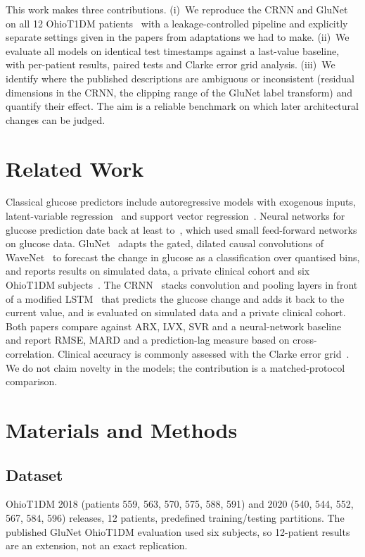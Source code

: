\documentclass[conference]{IEEEtran}
\begin{document}
This work makes three contributions. (i)~We reproduce the CRNN and GluNet on all 12 OhioT1DM patients~\cite{ohio} with a leakage-controlled pipeline and explicitly separate settings given in the papers from adaptations we had to make. (ii)~We evaluate all models on identical test timestamps against a last-value baseline, with per-patient results, paired tests and Clarke error grid analysis. (iii)~We identify where the published descriptions are ambiguous or inconsistent (residual dimensions in the CRNN, the clipping range of the GluNet label transform) and quantify their effect. The aim is a reliable benchmark on which later architectural changes can be judged.
\section{Related Work}
Classical glucose predictors include autoregressive models with exogenous inputs, latent-variable regression~\cite{lvx} and support vector regression~\cite{svr}. Neural networks for glucose prediction date back at least to~\cite{nnpg}, which used small feed-forward networks on glucose data. GluNet~\cite{glunet} adapts the gated, dilated causal convolutions of WaveNet~\cite{wavenet} to forecast the change in glucose as a classification over quantised bins, and reports results on simulated data, a private clinical cohort and six OhioT1DM subjects~\cite{ohio}. The CRNN~\cite{crnn} stacks convolution and pooling layers in front of a modified LSTM~\cite{lstm} that predicts the glucose change and adds it back to the current value, and is evaluated on simulated data and a private clinical cohort. Both papers compare against ARX, LVX, SVR and a neural-network baseline and report RMSE, MARD and a prediction-lag measure based on cross-correlation. Clinical accuracy is commonly assessed with the Clarke error grid~\cite{clarke}. We do not claim novelty in the models; the contribution is a matched-protocol comparison.
\section{Materials and Methods}
\subsection{Dataset}
OhioT1DM 2018 (patients 559, 563, 570, 575, 588, 591) and 2020 (540, 544, 552, 567, 584, 596) releases, 12 patients, predefined training/testing partitions. The published GluNet OhioT1DM evaluation used six subjects, so 12-patient results are an extension, not an exact replication.
\end{document}

